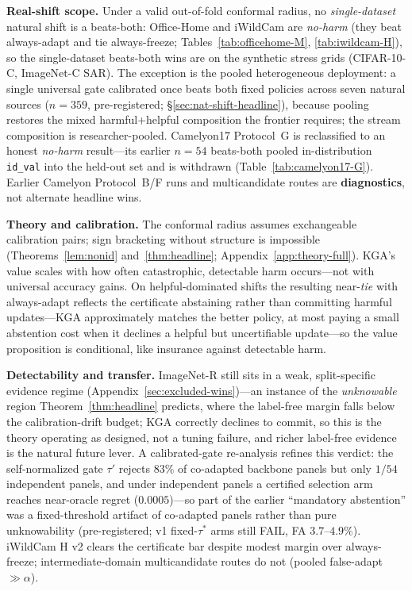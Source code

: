 \documentclass[conference]{IEEEtran}
\theoremstyle{plain}
\theoremstyle{definition}
\theoremstyle{remark}
\begin{document}
\textbf{Real-shift scope.} Under a valid out-of-fold conformal radius, no \emph{single-dataset}
natural shift is a beats-both: Office-Home and iWildCam are \emph{no-harm} (they beat always-adapt
and tie always-freeze; Tables~\ref{tab:officehome-M}, \ref{tab:iwildcam-H}), so the single-dataset
beats-both wins are on the synthetic stress grids (CIFAR-10-C, ImageNet-C SAR). The exception is
the pooled heterogeneous deployment: a single universal gate calibrated once beats both fixed
policies across seven natural sources ($n{=}359$, pre-registered; \S\ref{sec:nat-shift-headline}),
because pooling restores the mixed harmful+helpful composition the frontier requires; the stream
composition is researcher-pooled. Camelyon17 Protocol~G is reclassified to an
honest \emph{no-harm} result---its earlier $n{=}54$ beats-both pooled in-distribution
\texttt{id\_val} into the held-out set and is withdrawn (Table~\ref{tab:camelyon17-G}). Earlier
Camelyon Protocol~B/F runs and multicandidate routes are \textbf{diagnostics}, not alternate
headline wins.

\textbf{Theory and calibration.} The conformal radius assumes exchangeable calibration pairs;
sign bracketing without structure is impossible (Theorems~\ref{lem:nonid}
and~\ref{thm:headline}; Appendix~\ref{app:theory-full}). \textsc{KGA}'s value scales with how often catastrophic,
detectable harm occurs---not with universal accuracy gains. On helpful-dominated shifts the
resulting near-\emph{tie} with always-adapt reflects the certificate abstaining rather than
committing harmful updates---\textsc{KGA} approximately matches the better policy, at most paying a
small abstention cost when it declines a helpful but uncertifiable update---so the value proposition
is conditional, like insurance against detectable harm.

\textbf{Detectability and transfer.} ImageNet-R still sits in a weak, split-specific
evidence regime (Appendix~\ref{sec:excluded-wins})---an instance of the \emph{unknowable}
region Theorem~\ref{thm:headline} predicts, where the label-free margin falls below the
calibration-drift budget; \textsc{KGA} correctly declines to commit, so this is the theory
operating as designed, not a tuning failure, and richer label-free evidence is the natural
future lever. A calibrated-gate re-analysis refines this verdict: the self-normalized gate
$\tau'$ rejects $83\%$ of co-adapted backbone panels but only $1/54$ independent panels, and
under independent panels a certified selection arm reaches near-oracle regret ($0.0005$)---so
part of the earlier ``mandatory abstention'' was a fixed-threshold artifact of co-adapted
panels rather than pure unknowability (pre-registered; v1 fixed-$\tau^*$ arms still FAIL,
FA $3.7$--$4.9\%$). iWildCam H v2 clears the certificate bar
despite modest margin over always-freeze; intermediate-domain multicandidate routes do not
(pooled false-adapt $\gg\alpha$).
\end{document}
